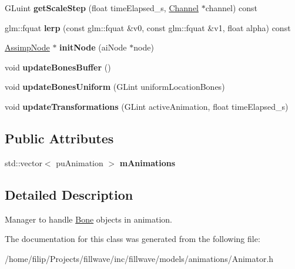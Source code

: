 \begin{DoxyCompactItemize}
\item 
G\+Luint {\bfseries get\+Scale\+Step} (float time\+Elapsed\+\_\+s, \hyperlink{classflw_1_1flf_1_1Channel}{Channel} $\ast$channel) const \hypertarget{classflw_1_1flf_1_1Animator_a9b4edcdcf423fcc7000b0e54cc45d0ed}{}\label{classflw_1_1flf_1_1Animator_a9b4edcdcf423fcc7000b0e54cc45d0ed}

\item 
glm\+::fquat {\bfseries lerp} (const glm\+::fquat \&v0, const glm\+::fquat \&v1, float alpha) const \hypertarget{classflw_1_1flf_1_1Animator_a7b484b82d950d18e74e67bb455c9cd55}{}\label{classflw_1_1flf_1_1Animator_a7b484b82d950d18e74e67bb455c9cd55}

\item 
\hyperlink{classflw_1_1flf_1_1AssimpNode}{Assimp\+Node} $\ast$ {\bfseries init\+Node} (ai\+Node $\ast$node)\hypertarget{classflw_1_1flf_1_1Animator_af5218d1feba253d783ad3b794a68ff85}{}\label{classflw_1_1flf_1_1Animator_af5218d1feba253d783ad3b794a68ff85}

\item 
void {\bfseries update\+Bones\+Buffer} ()\hypertarget{classflw_1_1flf_1_1Animator_a3ecba35ad6f5d30f958a53562a92a41c}{}\label{classflw_1_1flf_1_1Animator_a3ecba35ad6f5d30f958a53562a92a41c}

\item 
void {\bfseries update\+Bones\+Uniform} (G\+Lint uniform\+Location\+Bones)\hypertarget{classflw_1_1flf_1_1Animator_a6f0bd0a4cccade30d741db48db75b01e}{}\label{classflw_1_1flf_1_1Animator_a6f0bd0a4cccade30d741db48db75b01e}

\item 
void {\bfseries update\+Transformations} (G\+Lint active\+Animation, float time\+Elapsed\+\_\+s)\hypertarget{classflw_1_1flf_1_1Animator_ab630434c25ceb4dabc33cae6c4ed33cd}{}\label{classflw_1_1flf_1_1Animator_ab630434c25ceb4dabc33cae6c4ed33cd}

\end{DoxyCompactItemize}
\subsection*{Public Attributes}
\begin{DoxyCompactItemize}
\item 
std\+::vector$<$ pu\+Animation $>$ {\bfseries m\+Animations}\hypertarget{classflw_1_1flf_1_1Animator_a8a7d0006b90e014259c0c8ff2c1a5055}{}\label{classflw_1_1flf_1_1Animator_a8a7d0006b90e014259c0c8ff2c1a5055}

\end{DoxyCompactItemize}


\subsection{Detailed Description}
Manager to handle \hyperlink{classflw_1_1flf_1_1Bone}{Bone} objects in animation. 

The documentation for this class was generated from the following file\+:\begin{DoxyCompactItemize}
\item 
/home/filip/\+Projects/fillwave/inc/fillwave/models/animations/Animator.\+h\end{DoxyCompactItemize}
